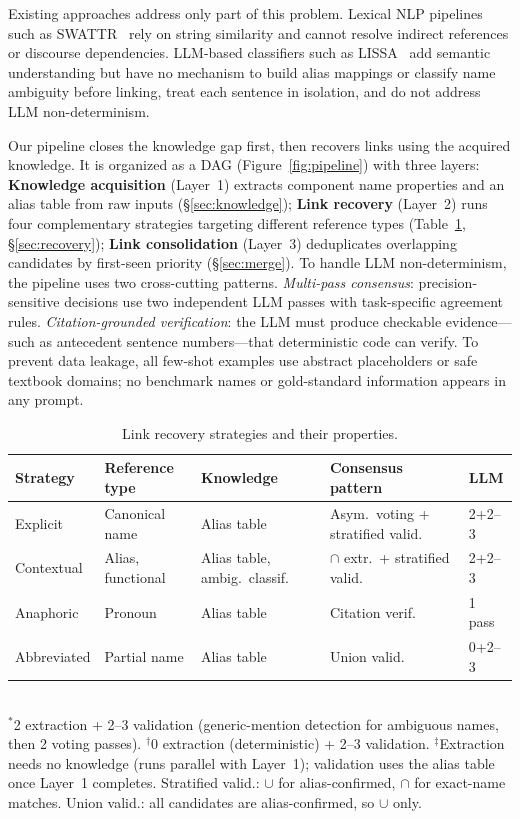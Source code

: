 Existing approaches address only part of this problem.
Lexical NLP pipelines such as SWATTR~\cite{swattr} rely on string
similarity and cannot resolve indirect references or discourse
dependencies.
LLM-based classifiers such as LISSA~\cite{lissa} add semantic
understanding but have no mechanism to build alias mappings or classify
name ambiguity before linking, treat each sentence in isolation, and
do not address LLM non-determinism.

Our pipeline closes the knowledge gap first, then recovers links
using the acquired knowledge.
It is organized as a DAG (Figure~\ref{fig:pipeline}) with three
layers:
\textbf{Knowledge acquisition} (Layer~1) extracts component name
properties and an alias table from raw inputs
(\S\ref{sec:knowledge});
\textbf{Link recovery} (Layer~2) runs four complementary strategies
targeting different reference types
(Table~\ref{tab:strategies}, \S\ref{sec:recovery});
\textbf{Link consolidation} (Layer~3) deduplicates overlapping
candidates by first-seen priority (\S\ref{sec:merge}).
To handle LLM non-determinism, the pipeline uses two cross-cutting
patterns.
\emph{Multi-pass consensus}: precision-sensitive decisions use two
independent LLM passes with task-specific agreement rules.
\emph{Citation-grounded verification}: the LLM must produce
checkable evidence---such as antecedent sentence numbers---that
deterministic code can verify.
To prevent data leakage, all few-shot examples use abstract
placeholders or safe textbook domains; no benchmark names or
gold-standard information appears in any prompt.

\begin{table}[t]
\caption{Link recovery strategies and their properties.}
\label{tab:strategies}
\centering\footnotesize
\begin{tabular}{@{}lllll@{}}
\toprule
\textbf{Strategy} & \textbf{Reference type} & \textbf{Knowledge} & \textbf{Consensus pattern} & \textbf{LLM} \\
\midrule
Explicit & Canonical name & Alias table\rlap{$^\ddagger$} & Asym.\ voting + stratified valid. & 2+2--3\rlap{$^*$} \\
Contextual & Alias, functional & Alias table, ambig.\ classif. & $\cap$ extr.\ + stratified valid. & 2+2--3\rlap{$^*$} \\
Anaphoric & Pronoun & Alias table & Citation verif. & 1 pass \\
Abbreviated & Partial name & Alias table & Union valid. & 0+2--3\rlap{$^\dagger$} \\
\bottomrule
\end{tabular}
\\[2pt]
{\scriptsize $^*$2 extraction + 2--3 validation (generic-mention detection for ambiguous names, then 2 voting passes).
$^\dagger$0 extraction (deterministic) + 2--3 validation.
$^\ddagger$Extraction needs no knowledge (runs parallel with Layer~1);
validation uses the alias table once Layer~1 completes.
Stratified valid.: $\cup$ for alias-confirmed, $\cap$ for exact-name matches.
Union valid.: all candidates are alias-confirmed, so $\cup$ only.}
\end{table}

